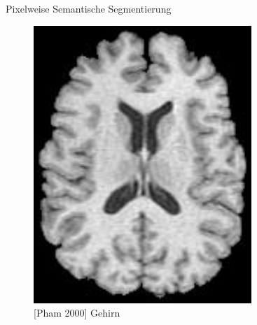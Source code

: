 \begin{frame}{Pixelweise Semantische Segmentierung}
\begin{figure}[ht]
\begin{minipage}[b]{0.45\linewidth}
            \includegraphics[width=\textwidth]{../images/brain-mr.png}
            \caption{[Pham 2000] Gehirn}
            \label{fig:lung}
        \end{minipage}
    \end{figure}
\end{frame}
